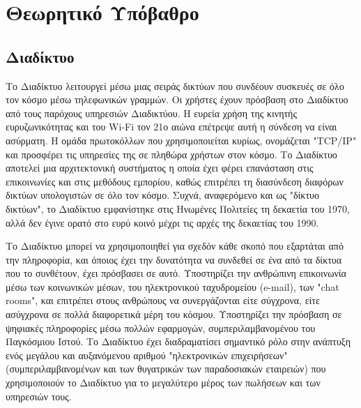 \chapter{Θεωρητικό Υπόβαθρο}

\section{Διαδίκτυο}
Το Διαδίκτυο λειτουργεί μέσω μιας σειράς δικτύων που συνδέουν συσκευές σε όλο τον κόσμο μέσω τηλεφωνικών γραμμών. Οι χρήστες έχουν πρόσβαση στο Διαδίκτυο από τους παρόχους υπηρεσιών Διαδικτύου. Η ευρεία χρήση της κινητής ευρυζωνικότητας και του Wi-Fi τον 21ο αιώνα επέτρεψε αυτή η σύνδεση να είναι ασύρματη. Η ομάδα πρωτοκόλλων που χρησιμοποιείται κυρίως, ονομάζεται "TCP/IP" και προσφέρει τις υπηρεσίες της σε πληθώρα χρήστων στον κόσμο. Το Διαδίκτυο αποτελεί μια αρχιτεκτονική συστήματος η οποία έχει φέρει επανάσταση στις επικοινωνίες και στις μεθόδους εμπορίου, καθώς επιτρέπει τη διασύνδεση διαφόρων δικτύων υπολογιστών σε όλο τον κόσμο. Συχνά, αναφερόμενο και ως "δίκτυο δικτύων", το Διαδίκτυο εμφανίστηκε στις Ηνωμένες Πολιτείες τη δεκαετία του 1970, αλλά δεν έγινε ορατό στο ευρύ κοινό μέχρι τις αρχές της δεκαετίας του 1990.

Το Διαδίκτυο μπορεί να χρησιμοποιηθεί για σχεδόν κάθε σκοπό που εξαρτάται από την πληροφορία, και όποιος έχει την δυνατότητα να συνδεθεί σε ένα από τα δίκτυα που το συνθέτουν, έχει πρόσβασει σε αυτό. Υποστηρίζει την ανθρώπινη επικοινωνία μέσω των κοινωνικών μέσων, του ηλεκτρονικού ταχυδρομείου (e-mail), των "chat rooms", και επιτρέπει στους ανθρώπους να συνεργάζονται είτε σύγχρονα, είτε ασύγχρονα σε πολλά διαφορετικά μέρη του κόσμου. Υποστηρίζει την πρόσβαση σε ψηφιακές πληροφορίες μέσω πολλών εφαρμογών, συμπεριλαμβανομένου του Παγκόσμιου Ιστού. Το Διαδίκτυο έχει διαδραματίσει σημαντικό ρόλο στην ανάπτυξη ενός μεγάλου και αυξανόμενου αριθμού "ηλεκτρονικών επιχειρήσεων" (συμπεριλαμβανομένων και των θυγατρικών των παραδοσιακών εταιρειών) που χρησιμοποιούν το Διαδίκτυο για το μεγαλύτερο μέρος των πωλήσεων και των υπηρεσιών τους.

